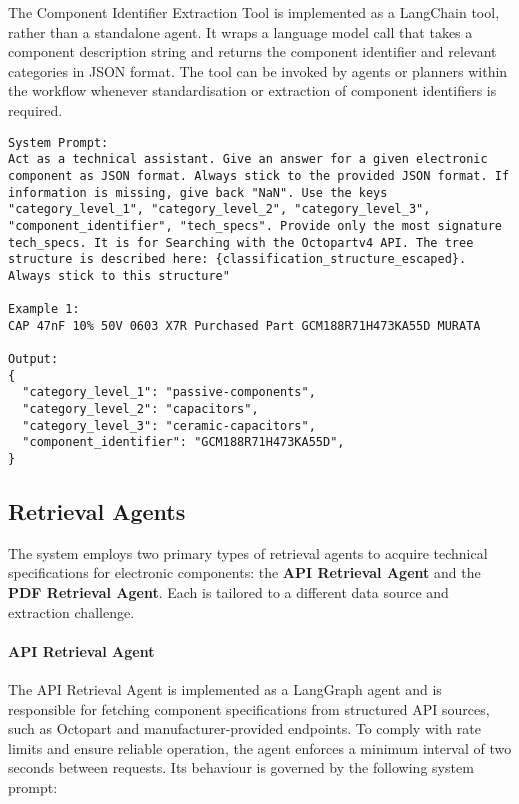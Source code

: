 The Component Identifier Extraction Tool is implemented as a LangChain tool, rather than a standalone agent. It wraps a language model call that takes a component description string and returns the component identifier and relevant categories in JSON format. The tool can be invoked by agents or planners within the workflow whenever standardisation or extraction of component identifiers is required.

\begin{lstlisting}[caption={System prompt, user prompt, and output for the Component Identifier Extraction Tool using the tagging prompt.}, label={lst:cid_schema}, breaklines=true]
System Prompt:
Act as a technical assistant. Give an answer for a given electronic component as JSON format. Always stick to the provided JSON format. If information is missing, give back "NaN". Use the keys "category_level_1", "category_level_2", "category_level_3", "component_identifier", "tech_specs". Provide only the most signature tech_specs. It is for Searching with the Octopartv4 API. The tree structure is described here: {classification_structure_escaped}. Always stick to this structure"

Example 1:
CAP 47nF 10% 50V 0603 X7R Purchased Part GCM188R71H473KA55D MURATA

Output:
{
  "category_level_1": "passive-components",
  "category_level_2": "capacitors",
  "category_level_3": "ceramic-capacitors",
  "component_identifier": "GCM188R71H473KA55D",
}
\end{lstlisting}

\subsection{Retrieval Agents}

The system employs two primary types of retrieval agents to acquire technical specifications for electronic components: the \textbf{API Retrieval Agent} and the \textbf{PDF Retrieval Agent}. Each is tailored to a different data source and extraction challenge.

\paragraph{API Retrieval Agent}
The API Retrieval Agent is implemented as a LangGraph agent and is responsible for fetching component specifications from structured API sources, such as Octopart and manufacturer-provided endpoints. To comply with rate limits and ensure reliable operation, the agent enforces a minimum interval of two seconds between requests. Its behaviour is governed by the following system prompt:

